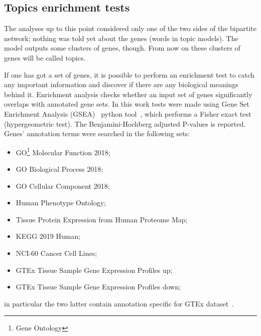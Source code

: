 \FloatBarrier
\subsection{Topics enrichment tests}
The analyses up to this point considered only one of the two sides of the bipartite network; nothing was told yet about the genes (words in topic models).
The model outputs some clusters of genes, though.  From now on these clusters of genes will be called topics.

If one has got a set of genes, it is possible to perform an enrichment test to catch any important information and discover if there are any biological meanings behind it. Enrichment analysis checks whether an input set of genes significantly overlaps with annotated gene sets.
In this work tests were made using Gene Set Enrichment Analysis (GSEA)~\cite{subramanian2005gene} python tool~\cite{Kuleshov2016}, which performs a Fisher exact test (hypergeometric test). The Benjamini-Hochberg adjusted P-values is reported. Genes' annotation terms were searched in the following sets: 
\begin{itemize}
		\item GO\footnote{Gene Ontology} Molecular Function 2018;
		\item GO Biological Process 2018;
		\item GO Cellular Component 2018;
		\item Human Phenotype Ontology;
		\item Tissue Protein Expression from Human Proteome Map;
		\item KEGG 2019 Human;
		\item NCI-60 Cancer Cell Lines;
		\item GTEx Tissue Sample Gene Expression Profiles up;
		\item GTEx Tissue Sample Gene Expression Profiles down;
\end{itemize}
in particular the two latter contain annotation specific for GTEx dataset~\cite{Ardlie2015}.

